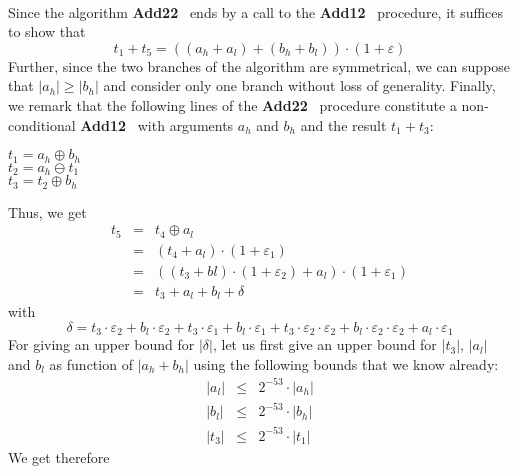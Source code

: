 \documentclass[a4paper,10pt,twoside]{article}
\newenvironment{proof}[1][Proof]{\begin{trivlist}
\item[\hskip \labelsep {\bfseries #1}]}{\end{trivlist}}
\newcommand{\hi}{\ensuremath{\mathit{h}}}
\newcommand{\lo}{\ensuremath{\mathit{l}}}
\newcommand{\Add}{{\bf Add12}}
\newcommand{\AddDD}{{\bf Add22}}
\renewcommand{\epsilon}{\varepsilon}
\begin{document}
\begin{proof} \label{AddDDpreuve} ~ \\
Since the algorithm \AddDD~ ends by a call to the \Add~ procedure, it suffices
to show that
$$t_1 + t_5 = \left(\left(a_\hi + a_\lo \right) + \left( b_\hi + b_\lo \right)\right) \cdot \left(1 + \epsilon\right)$$
Further, since the two branches of the algorithm are symmetrical, we can
suppose that $\left \vert a_\hi \right \vert \geq \left \vert b_\hi \right \vert$
and consider only one branch without loss of generality.
Finally, we remark that the following lines of the \AddDD~ procedure
constitute a non-conditional \Add~ with arguments $a_\hi$ and
$b_\hi$ and the result $t_1 + t_3$:
\begin{center}
\begin{minipage}[b]{50mm}
$t_1 = a_\hi \oplus b_\hi$ \\
$t_2 = a_\hi \ominus t_1$ \\
$t_3 = t_2 \oplus b_\hi$
\end{minipage}
\end{center}
Thus, we get
\begin{eqnarray*}
t_5 & = & t_4 \oplus a_\lo \\
& = & \left( t_4 + a_\lo \right) \cdot \left( 1 + \epsilon_1 \right) \\
& = & \left( \left( t_3 + bl \right) \cdot \left( 1 + \epsilon_2 \right) + a_\lo \right) \cdot \left( 1 + \epsilon_1 \right) \\
& = & t_3 + a_\lo + b_\lo + \delta
\end{eqnarray*}
with
$$\delta = t_3\cdot\epsilon_2 + b_\lo\cdot\epsilon_2 + t_3\cdot\epsilon_1 + b_\lo\cdot\epsilon_1 + t_3\cdot\epsilon_2\cdot\epsilon_2
+ b_\lo\cdot\epsilon_2\cdot\epsilon_2 + a_\lo\cdot\epsilon_1$$
For giving an upper bound for $\left \vert \delta \right \vert$, let us first
give an upper bound for $\left \vert t_3 \right \vert$, $\left \vert a_\lo \right \vert$ and
$b_\lo$ as function of $\left \vert a_\hi + b_\hi \right \vert$ using the
following bounds that we know already:
\begin{eqnarray*}
\left \vert a_\lo \right \vert & \leq & 2^{-53} \cdot \left \vert a_\hi \right \vert \\
\left \vert b_\lo \right \vert & \leq & 2^{-53} \cdot \left \vert b_\hi \right \vert \\
\left \vert t_3 \right \vert & \leq & 2^{-53} \cdot \left \vert t_1 \right \vert
\end{eqnarray*}
We get therefore
\begin{eqnarray*}

\end{eqnarray*}
\end{proof}
\end{document}
